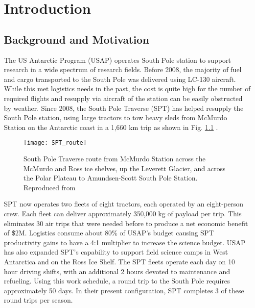 \chapter{Introduction} \label{chapterintroduction}
\section{Background and Motivation}
The US Antarctic Program (USAP) operates South Pole station to support research in a wide spectrum of research fields. Before 2008, the majority of fuel and cargo transported to the South Pole was delivered using LC-130 aircraft. While this met logistics needs in the past, the cost is quite high for the number of required flights and resupply via aircraft of the station can be easily obstructed by weather.  Since 2008, the South Pole Traverse (SPT) has helped resupply the South Pole station, using large tractors to tow heavy sleds from McMurdo Station on the Antarctic coast in a 1,660 km trip as shown in Fig. \ref{fig:SPT_route} \cite{lever2004mobility}. 
\begin{figure}[t]
    \centering
    \texttt{[image: SPT\_route]}
    \caption{South Pole Traverse route from McMurdo Station across the McMurdo and Ross ice shelves, up the Leverett Glacier, and across the Polar Plateau to Amundsen-Scott South Pole Station. Reproduced from \cite{lever2004mobility}}
    \label{fig:SPT_route}
\end{figure}

SPT now operates two fleets of eight tractors, each operated by an eight-person crew.  Each fleet can deliver approximately 350,000 kg of payload per trip. This eliminates 30 air trips that were needed before to produce a net economic benefit of \$2M.  Logistics consume about 80\% of USAP's budget causing SPT productivity gains to have a 4:1 multiplier to increase the science budget. USAP has also expanded SPT's capability to support field science camps in West Antarctica and on the Ross Ice Shelf. The SPT fleets operate each day on 10 hour driving shifts, with an additional 2 hours devoted to maintenance and refueling.  Using this work schedule, a round trip to the South Pole requires approximately 50 days. In their present configuration, SPT completes 3 of these round trips per season. 

